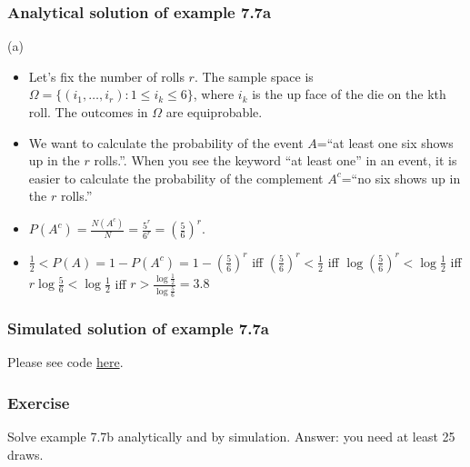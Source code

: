 \begin{frame}
    \frametitle{Analytical solution of example 7.7a}

	(a)
    \begin{itemize}[<+->]

		\item Let's fix the number of rolls $r$. The sample space is
$\Omega=\{(i_1,\ldots,i_r): 1\leq i_k\leq 6\}$, where $i_k$ is the up face of
the die on the kth roll. The outcomes in $\Omega$ are equiprobable.

        \item We want to calculate the probability of the event $A$=``at least
            one six shows up in the $r$ rolls.''. When you see the keyword ``at
            least one'' in an event, it is easier to calculate the probability
            of the complement $A^c$=``no six shows up in the $r$ rolls.''

        \item
            $P(A^c)=\frac{N(A^c)}{N}=\frac{5^r}{6^r}=\left(\frac{5}{6}\right)^r$.

        \item
            $\frac{1}{2}<P(A)=1-P(A^c)=1-\left(\frac{5}{6}\right)^r$
            iff
            $\left(\frac{5}{6}\right)^r<\frac{1}{2}$ iff
            $\log\left(\frac{5}{6}\right)^r<\log\frac{1}{2}$ iff
            $r\log\frac{5}{6}<\log\frac{1}{2}$ iff
            $r>\frac{\log\frac{1}{2}}{\log\frac{5}{6}}=3.8$
    \end{itemize}
\end{frame}

\begin{frame}[fragile]
    \frametitle{Simulated solution of example 7.7a}

    Please see code \href{https://joacorapela.github.io/gcnuBridging2023/auto_examples/foundations/plot_example7_7a.html#sphx-glr-auto-examples-foundations-plot-example7-7a-py}{here}.

\end{frame}

\begin{frame}
    \frametitle{Exercise}

    Solve example 7.7b analytically and by simulation. Answer: you need at least 25 draws.

\end{frame}

